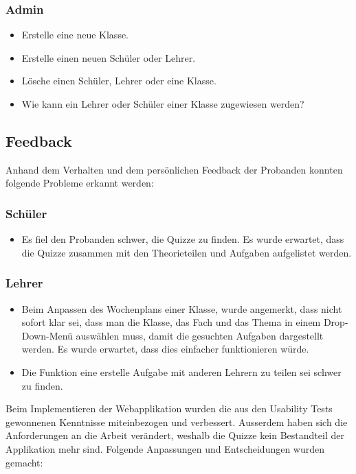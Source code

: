 \subsubsection*{Admin}
\begin{itemize}
	\item Erstelle eine neue Klasse.
	\item Erstelle einen neuen Schüler oder Lehrer.
	\item Lösche einen Schüler, Lehrer oder eine Klasse.
	\item Wie kann ein Lehrer oder Schüler einer Klasse zugewiesen werden?
\end{itemize} 

\subsection*{Feedback}
Anhand dem Verhalten und dem persönlichen Feedback der Probanden konnten folgende Probleme erkannt werden:

\subsubsection*{Schüler}
\begin{itemize}
	\item Es fiel den Probanden schwer, die Quizze zu finden. Es wurde erwartet, dass die Quizze zusammen mit den Theorieteilen und Aufgaben aufgelistet werden.
\end{itemize}

\subsubsection*{Lehrer}
\begin{itemize}
	\item Beim Anpassen des Wochenplans einer Klasse, wurde angemerkt, dass nicht sofort klar sei, dass man die Klasse, das Fach und das Thema in einem Drop-Down-Menü auswählen muss, damit die gesuchten Aufgaben dargestellt werden. Es wurde erwartet, dass dies einfacher funktionieren würde.
	\item Die Funktion eine erstelle Aufgabe mit anderen Lehrern zu teilen sei schwer zu finden.
\end{itemize}

Beim Implementieren der Webapplikation wurden die aus den Usability Tests gewonnenen Kenntnisse miteinbezogen und verbessert. Ausserdem haben sich die Anforderungen an die Arbeit verändert, weshalb die Quizze kein Bestandteil der Applikation mehr sind. Folgende Anpassungen und Entscheidungen wurden gemacht: \\


